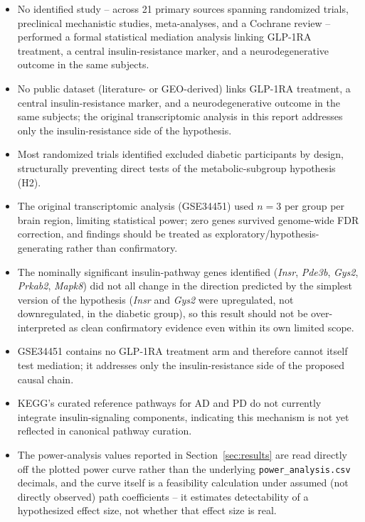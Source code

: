 \documentclass[11pt, a4paper]{article}
\begin{document}
\begin{itemize}[leftmargin=*]
  \item No identified study -- across 21 primary sources spanning randomized
  trials, preclinical mechanistic studies, meta-analyses, and a Cochrane
  review -- performed a formal statistical mediation analysis linking
  GLP-1RA treatment, a central insulin-resistance marker, and a
  neurodegenerative outcome in the same subjects.
  \item No public dataset (literature- or GEO-derived) links GLP-1RA
  treatment, a central insulin-resistance marker, and a neurodegenerative
  outcome in the same subjects; the original transcriptomic analysis in this
  report addresses only the insulin-resistance side of the hypothesis.
  \item Most randomized trials identified excluded diabetic participants by
  design, structurally preventing direct tests of the metabolic-subgroup
  hypothesis (H2).
  \item The original transcriptomic analysis (GSE34451) used $n=3$ per
  group per brain region, limiting statistical power; zero genes survived
  genome-wide FDR correction, and findings should be treated as
  exploratory/hypothesis-generating rather than confirmatory.
  \item The nominally significant insulin-pathway genes identified
  (\textit{Insr}, \textit{Pde3b}, \textit{Gys2}, \textit{Prkab2},
  \textit{Mapk8}) did not all change in the direction predicted by the
  simplest version of the hypothesis (\textit{Insr} and \textit{Gys2} were
  upregulated, not downregulated, in the diabetic group), so this result
  should not be over-interpreted as clean confirmatory evidence even within
  its own limited scope.
  \item GSE34451 contains no GLP-1RA treatment arm and therefore cannot
  itself test mediation; it addresses only the insulin-resistance side of
  the proposed causal chain.
  \item KEGG's curated reference pathways for AD and PD do not currently
  integrate insulin-signaling components, indicating this mechanism is not
  yet reflected in canonical pathway curation.
  \item The power-analysis values reported in Section~\ref{sec:results} are
  read directly off the plotted power curve rather than the underlying
  \texttt{power\_analysis.csv} decimals, and the curve itself is a
  feasibility calculation under assumed (not directly observed) path
  coefficients -- it estimates detectability of a hypothesized effect size,
  not whether that effect size is real.
\end{itemize}
\end{document}
